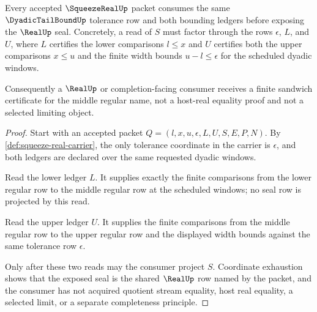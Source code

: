 \begin{theorem}
\label{thm:squeeze-real-sandwich-exactness}
Every accepted $\SqueezeRealUp$ packet consumes the same $\DyadicTailBoundUp$ tolerance row and both bounding ledgers before exposing the $\RealUp$ seal. Concretely, a read of $S$ must factor through the rows $\epsilon$, $L$, and $U$, where $L$ certifies the lower comparisons $l \le x$ and $U$ certifies both the upper comparisons $x \le u$ and the finite width bounds $u-l \le \epsilon$ for the scheduled dyadic windows.

Consequently a $\RealUp$ or completion-facing consumer receives a finite sandwich certificate for the middle regular name, not a host-real equality proof and not a selected limiting object.
\end{theorem}
\begin{proof}
Start with an accepted packet $Q=(l,x,u,\epsilon,L,U,S,E,P,N)$. By \autoref{def:squeeze-real-carrier}, the only tolerance coordinate in the carrier is $\epsilon$, and both ledgers are declared over the same requested dyadic windows.

Read the lower ledger $L$. It supplies exactly the finite comparisons from the lower regular row to the middle regular row at the scheduled windows; no seal row is projected by this read.

Read the upper ledger $U$. It supplies the finite comparisons from the middle regular row to the upper regular row and the displayed width bounds against the same tolerance row $\epsilon$.

Only after these two reads may the consumer project $S$. Coordinate exhaustion shows that the exposed seal is the shared $\RealUp$ row named by the packet, and the consumer has not acquired quotient stream equality, host real equality, a selected limit, or a separate completeness principle.
\end{proof}

